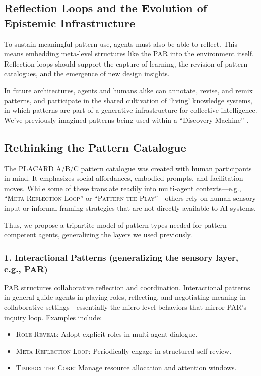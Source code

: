 \documentclass[acmlarge,timestamp]{acmart}
\providecommand{\tightlist}{%
  \setlength{\itemsep}{0pt}\setlength{\parskip}{0pt}}
\begin{document}
{\subsection{Reflection Loops and the Evolution of Epistemic Infrastructure}

To sustain meaningful pattern use, agents must also be able to
reflect.  This means embedding meta-level structures like the PAR into
the environment itself.  Reflection loops should support the capture
of learning, the revision of pattern catalogues, and the emergence of
new design insights.

In future architectures, agents and humans alike can annotate, revise,
and remix patterns, and participate in the shared cultivation of
‘living’ knowledge systems, in which patterns are part of a
generative infrastructure for collective intelligence.  We’ve
previously imagined patterns being used within a “Discovery Machine”
\cite{Tedeschi2024}.

\subsection{Rethinking the Pattern Catalogue}

The PLACARD A/B/C pattern catalogue was created with human
participants in mind. It emphasizes social affordances, embodied
prompts, and facilitation moves. While some of these translate readily
into multi-agent contexts---e.g., “{\scshape {Meta-Reflection Loop}}”
or “{\scshape {Pattern the Play}}”---others rely on human sensory
input or informal framing strategies that are not directly available
to AI systems.

Thus, we propose a tripartite model of pattern types needed for
pattern-competent agents, generalizing the layers we used previously.

\subsubsection*{1. Interactional Patterns (generalizing the sensory layer, e.g., PAR)}

{PAR structures collaborative reflection and coordination. Interactional
patterns in general guide agents in playing roles, reflecting, and
negotiating meaning in collaborative settings---essentially the
micro-level behaviors that mirror PAR's inquiry loop. }{Examples
include:}

\begin{itemize}
\tightlist
\item[]
  {\scshape{Role Reveal}}{: Adopt explicit roles in multi-agent dialogue.}
\item[]
  {\scshape{Meta-Reflection Loop}}{: Periodically engage in structured
  self-review.}
\item[]
  {\scshape{Timebox the Core}}{: Manage resource allocation and attention
  windows.}
\end{itemize}

}
\end{document}
